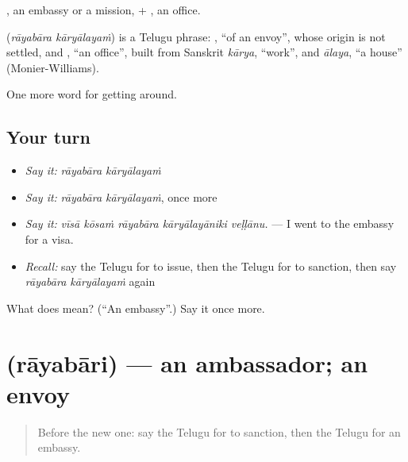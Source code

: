 , an embassy or a mission, + , an office.

\begin{cousinweb}
\textbf{ } (\emph{rāyabāra kāryālayaṁ}) is a Telugu phrase: , \textquotedblleft{}of an envoy\textquotedblright{}, whose origin is not settled, and , \textquotedblleft{}an office\textquotedblright{}, built from Sanskrit \emph{kārya}, \textquotedblleft{}work\textquotedblright{}, and \emph{ālaya}, \textquotedblleft{}a house\textquotedblright{} (Monier-Williams).
\end{cousinweb}

\begin{grammarlens}[title={What you've built}]
One more word for getting around.
\end{grammarlens}

\subsection*{Your turn}
\begin{itemize}
\raggedright
  \item \emph{Say it:} \emph{rāyabāra kāryālayaṁ}
  \item \emph{Say it:} \emph{rāyabāra kāryālayaṁ}, once more
  \item \emph{Say it:} \emph{vīsā kōsaṁ rāyabāra kāryālayāniki veḷḷānu.} — I went to the embassy for a visa.
  \item \emph{Recall:} say the Telugu for to issue, then the Telugu for to sanction, then say \emph{rāyabāra kāryālayaṁ} again
\end{itemize}

\begin{tcolorbox}[breakable,colback=teal!4,colframe=teal!35!black,title={Before you move on}]
What does   mean? (\textquotedblleft{}An embassy\textquotedblright{}.) Say it once more.
\end{tcolorbox}
\section[\texorpdfstring{\te{రాయబారి} (rāyabāri)}{రాయబారి (rāyabāri)}]{ (rāyabāri) — an ambassador; an envoy}

\label{lesson:TE-C463-rayabari}



\begin{quote}
Before the new one: say the Telugu for to sanction, then the Telugu for an embassy.
\end{quote}

